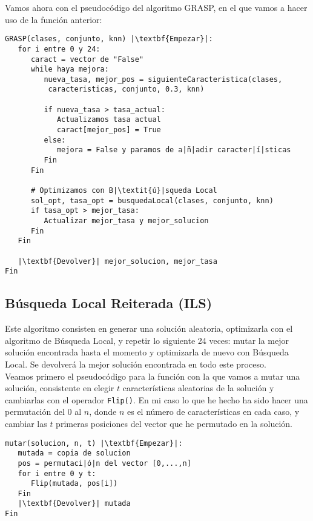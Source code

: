 \documentclass[12pt]{article}
\begin{document}
Vamos ahora con el pseudocódigo del algoritmo GRASP, en el que vamos a hacer uso de la función anterior:
\begin{lstlisting}
GRASP(clases, conjunto, knn) |\textbf{Empezar}|:
   for i entre 0 y 24:
      caract = vector de "False"
      while haya mejora:
         nueva_tasa, mejor_pos = siguienteCaracteristica(clases,
          caracteristicas, conjunto, 0.3, knn)
      
         if nueva_tasa > tasa_actual:
            Actualizamos tasa actual
            caract[mejor_pos] = True
         else:
            mejora = False y paramos de a|ñ|adir caracter|í|sticas
         Fin
      Fin
   
      # Optimizamos con B|\textit{ú}|squeda Local
      sol_opt, tasa_opt = busquedaLocal(clases, conjunto, knn)
      if tasa_opt > mejor_tasa:
         Actualizar mejor_tasa y mejor_solucion
      Fin
   Fin
   
   |\textbf{Devolver}| mejor_solucion, mejor_tasa
Fin

\end{lstlisting}

\subsection{Búsqueda Local Reiterada (ILS)}

Este algoritmo consisten en generar una solución aleatoria, optimizarla con el algoritmo de Búsqueda Local, y repetir lo siguiente 24 veces: mutar la mejor solución encontrada hasta el momento y optimizarla de nuevo con Búsqueda Local. Se devolverá la mejor solución encontrada en todo este proceso.\\

Veamos primero el pseudocódigo para la función con la que vamos a mutar una solución, consistente en elegir $t$ características aleatorias de la solución y cambiarlas con el operador \texttt{Flip()}. En mi caso lo que he hecho ha sido hacer una permutación del 0 al $n$, donde $n$ es el número de características en cada caso, y cambiar las $t$ primeras posiciones del vector que he permutado en la solución.

\begin{lstlisting}
mutar(solucion, n, t) |\textbf{Empezar}|:
   mutada = copia de solucion
   pos = permutaci|ó|n del vector [0,...,n]
   for i entre 0 y t:
      Flip(mutada, pos[i])
   Fin
   |\textbf{Devolver}| mutada
Fin

\end{lstlisting}
\end{document}
